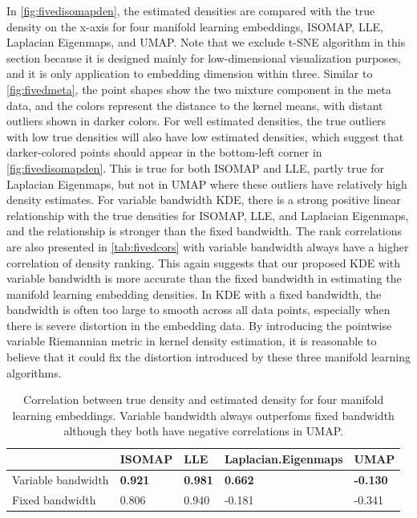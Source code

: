 \documentclass[11pt,a4paper,]{article}
\begin{document}
In \autoref{fig:fivedisomapden}, the estimated densities are compared with the true density on the x-axis for four manifold learning embeddings, ISOMAP, LLE, Laplacian Eigenmaps, and UMAP. Note that we exclude t-SNE algorithm in this section because it is designed mainly for low-dimensional visualization purposes, and it is only application to embedding dimension within three.
Similar to \autoref{fig:fivedmeta}, the point shapes show the two mixture component in the meta data, and the colors represent the distance to the kernel means, with distant outliers shown in darker colors. For well estimated densities, the true outliers with low true densities will also have low estimated densities, which suggest that darker-colored points should appear in the bottom-left corner in \autoref{fig:fivedisomapden}. This is true for both ISOMAP and LLE, partly true for Laplacian Eigenmaps, but not in UMAP where these outliers have relatively high density estimates.
For variable bandwidth KDE, there is a strong positive linear relationship with the true densities for ISOMAP, LLE, and Laplacian Eigenmaps, and the relationship is stronger than the fixed bandwidth. The rank correlations are also presented in \autoref{tab:fivedcors} with variable bandwidth always have a higher correlation of density ranking. This again suggests that our proposed KDE with variable bandwidth is more accurate than the fixed bandwidth in estimating the manifold learning embedding densities. In KDE with a fixed bandwidth, the bandwidth is often too large to smooth across all data points, especially when there is severe distortion in the embedding data. By introducing the pointwise variable Riemannian metric in kernel density estimation, it is reasonable to believe that it could fix the distortion introduced by these three manifold learning algorithms.

\begin{table}

\caption{\label{tab:fivedcors}Correlation between true density and estimated density for four manifold learning embeddings. Variable bandwidth always outperfoms fixed bandwidth although they both have negative correlations in UMAP.}
\centering
\begin{tabular}[t]{l>{}l>{}l>{}l>{}l}
\toprule
  & ISOMAP & LLE & Laplacian.Eigenmaps & UMAP\\
\midrule
Variable bandwidth & \textbf{0.921} & \textbf{0.981} & \textbf{0.662} & \textbf{-0.130}\\
Fixed bandwidth & 0.806 & 0.940 & -0.181 & -0.341\\
\bottomrule
\end{tabular}
\end{table}
\end{document}
